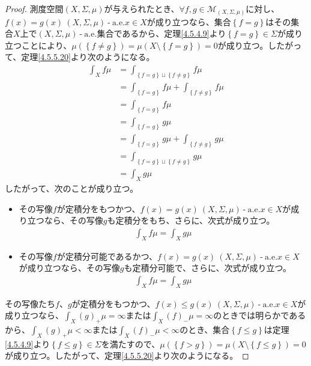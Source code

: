 \documentclass[dvipdfmx]{jsarticle}
\begin{document}
\begin{proof}
測度空間$(X,\varSigma,\mu)$が与えられたとき、$\forall f,g \in \mathcal{M}_{(X,\varSigma,\mu)}$に対し、$f(x) = g(x)\ (X,\varSigma,\mu) \ \text{-} \ \mathrm{a.e.}x \in X$が成り立つなら、集合$\left\{ f = g \right\}$はその集合$X$上で$(X,\varSigma,\mu) \ \text{-} \ \mathrm{a.e.}$集合であるから、定理\ref{4.5.4.9}より$\left\{ f = g \right\} \in \varSigma$が成り立つことにより、$\mu\left( \left\{ f \neq g \right\} \right) = \mu\left( X \setminus \left\{ f = g \right\} \right) = 0$が成り立つ。したがって、定理\ref{4.5.5.20}より次のようになる。
\begin{align*}
\int_{X} {f\mu} &= \int_{\left\{ f = g \right\} \sqcup \left\{ f \neq g \right\}} {f\mu}\\
&= \int_{\left\{ f = g \right\}} {f\mu} + \int_{\left\{ f \neq g \right\}} {f\mu}\\
&= \int_{\left\{ f = g \right\}} {f\mu}\\
&= \int_{\left\{ f = g \right\}} {g\mu}\\
&= \int_{\left\{ f = g \right\}} {g\mu} + \int_{\left\{ f \neq g \right\}} {g\mu}\\
&= \int_{\left\{ f = g \right\} \sqcup \left\{ f \neq g \right\}} {g\mu}\\
&= \int_{X} {g\mu}
\end{align*}
したがって、次のことが成り立つ。
\begin{itemize}
\item
  その写像$f$が定積分をもつかつ、$f(x) = g(x)\ (X,\varSigma,\mu) \ \text{-} \ \mathrm{a.e.}x \in X$が成り立つなら、その写像$g$も定積分をもち、さらに、次式が成り立つ。
\begin{align*}
\int_{X} {f\mu} = \int_{X} {g\mu}
\end{align*}
\item
  その写像$f$が定積分可能であるかつ、$f(x) = g(x)\ (X,\varSigma,\mu) \ \text{-} \ \mathrm{a.e.}x \in X$が成り立つなら、その写像$g$も定積分可能で、さらに、次式が成り立つ。
\begin{align*}
\int_{X} {f\mu} = \int_{X} {g\mu}
\end{align*}
\end{itemize}
その写像たち$f$、$g$が定積分をもつかつ、$f(x) \leq g(x)\ (X,\varSigma,\mu) \ \text{-} \ \mathrm{a.e.}x \in X$が成り立つなら、$\int_{X} {(g)_{+}\mu} = \infty$または$\int_{X} {(f)_{-}\mu} = \infty$のときでは明らかであるから、$\int_{X} {(g)_{+}\mu} < \infty$または$\int_{X} {(f)_{-}\mu} < \infty$のとき、集合$\left\{ f \leq g \right\}$は定理\ref{4.5.4.9}より$\left\{ f \leq g \right\} \in \varSigma$を満たすので、$\mu\left( \left\{ f > g \right\} \right) = \mu\left( X \setminus \left\{ f \leq g \right\} \right) = 0$が成り立つ。したがって、定理\ref{4.5.5.20}より次のようになる。

\end{proof}
\end{document}

